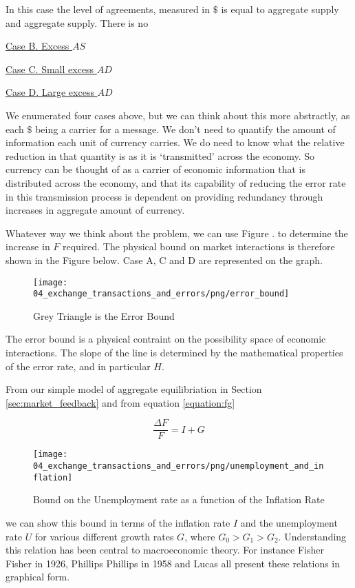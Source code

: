 In this case the level of agreements, measured in $\$$ is equal to aggregate supply and aggregate
supply. There is no  

\underline{Case B. Excess $AS$}

\underline{Case C. Small excess $AD$}

\underline{Case D. Large excess $AD$}

We enumerated four cases above, but we can think about this more abstractly, as each $\$$ being a
carrier for a message. We don't need to quantify the amount of information each unit of currency
carries. We do need to know what the relative reduction in that quantity is as it is `transmitted'
across the economy. So currency can be thought of as a carrier of economic information that is
distributed across the economy, and that its capability of reducing the error rate in this
transmission process is dependent on providing redundancy through increases in aggregate amount of
currency.

Whatever way we think about the problem, we can use Figure \label{fig:shannons_proof}. to determine the
increase in $F$ required. The physical bound on market interactions is therefore shown in the Figure
below. Case A, C and D are represented on the graph.

\begin{figure}[H]
\centering
\texttt{[image: 04\_exchange\_transactions\_and\_errors/png/error\_bound]}
\caption{Grey Triangle is the Error Bound}
\label{fig:error_bound}
\end{figure}

The error bound is a physical contraint on the possibility space of economic interactions. The slope
of the line is determined by the mathematical properties of the error rate, and in particular $H$.

From our simple model of aggregate equilibriation in Section \ref{sec:market_feedback} and from
equation \ref{equation:fg}

\begin{equation}
    \frac {\Delta F} F = I + G
\end{equation}

\begin{figure}[H]
\centering
\texttt{[image: 04\_exchange\_transactions\_and\_errors/png/unemployment\_and\_inflation]}
\caption{Bound on the Unemployment rate as a function of the Inflation Rate}
\label{fig:ui_bound}
\end{figure}

we can show this bound in terms of the inflation
rate $I$ and the unemployment rate $U$ for various different growth rates $G$, where $G_0 > G_1 >
G_2$. Understanding this relation has been central to macroeconomic theory. For instance Fisher
Fisher \cite{fisher1926} in 1926, Phillips Phillips \cite{phillips1958} in 1958 and Lucas
\cite{lucas1996} all present these relations in graphical form.

